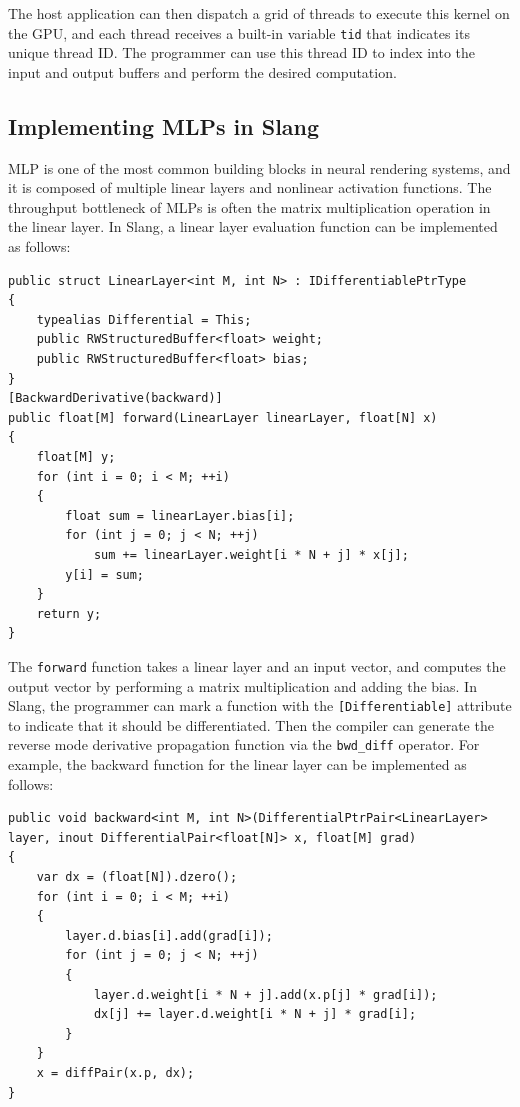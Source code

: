 \documentclass{article}
\begin{document}
The host application can then dispatch a grid of threads to execute this kernel on the GPU, and each thread receives a built-in variable \texttt{tid} that indicates its unique thread ID. The programmer can use this thread ID to index into the input and output buffers and perform the desired computation.

\subsection{Implementing MLPs in Slang}

MLP is one of the most common building blocks in neural rendering systems, and it is composed of multiple linear layers and nonlinear activation functions. The throughput bottleneck of MLPs is often the matrix multiplication operation in the linear layer. In Slang, a linear layer evaluation function can be implemented as follows:

\begin{verbatim}
public struct LinearLayer<int M, int N> : IDifferentiablePtrType
{
    typealias Differential = This;
    public RWStructuredBuffer<float> weight;
    public RWStructuredBuffer<float> bias;
}
[BackwardDerivative(backward)]
public float[M] forward(LinearLayer linearLayer, float[N] x)
{
    float[M] y;
    for (int i = 0; i < M; ++i)
    {
        float sum = linearLayer.bias[i];
        for (int j = 0; j < N; ++j)
            sum += linearLayer.weight[i * N + j] * x[j];
        y[i] = sum;
    }
    return y;
}
\end{verbatim}

The \texttt{forward} function takes a linear layer and an input vector, and computes the output vector by performing a matrix multiplication and adding the bias. In Slang, the programmer can mark a function with the \texttt{[Differentiable]} attribute to indicate that it should be differentiated. Then the compiler can generate the reverse mode derivative propagation function via the \texttt{bwd\_diff} operator. For example, the backward function for the linear layer can be implemented as follows:

\begin{verbatim}
public void backward<int M, int N>(DifferentialPtrPair<LinearLayer> layer, inout DifferentialPair<float[N]> x, float[M] grad)
{
    var dx = (float[N]).dzero();
    for (int i = 0; i < M; ++i)
    {
        layer.d.bias[i].add(grad[i]);
        for (int j = 0; j < N; ++j)
        {
            layer.d.weight[i * N + j].add(x.p[j] * grad[i]);
            dx[j] += layer.d.weight[i * N + j] * grad[i];
        }
    }
    x = diffPair(x.p, dx);
}
\end{verbatim}
\end{document}
